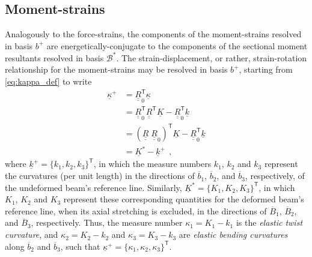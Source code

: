 \documentclass[12pt,a4paper,oneside,english]{abntex2} %
\newcommand{\vect}[1]{\underline{#1}}
\newcommand{\uvec}[1]{\overline{#1}}
\def\tens#1{\underline{\underline{#1}}}
\def\lp{\left(}
\def\rp{\right)}
\def\T{\mathsf{T}}
\def\bp{b^+}
\def\B*{\mathcal{B}^*}
\def\R{\tens{R}}
\def\RT{\R^\T}
\def\Rz{\R_0}
\def\RzT{\R^\T_0}
\def\kap{\vect{\kappa}}
\def\kapp{\kap^{+}}
\def\k{\vect{k}}
\def\kp{\k^{+}}
\def\K{\vect{K}}
\def\Ks{\K^{*}}
\begin{document}
\subsection{Moment-strains}

Analogously to the force-strains, the components of the moment-strains resolved in basis $\bp$ are energetically-conjugate to the components of the sectional moment resultants resolved in basis $\B*$.
The strain-displacement, or rather, strain-rotation relationship for the moment-strains may be resolved in basis $\bp$, starting from \cref{eq:kappa_def} to write
\begin{align}
    \kapp 
    &= \RzT\kap \nonumber 
    \\
    &= \RzT\RT\K-\RzT\k \nonumber 
    \\
    &= \lp\R\;\Rz\rp^\T\K - \RzT\k \nonumber 
    \\
    &= \Ks - \kp \ \ ,
    \label{eq:kappa_plus}
\end{align}
where $\kp = \{k_1,k_2,k_3\}^\T$, in which the measure numbers $k_1$, $k_2$ and $k_3$ represent the curvatures (per unit length) in the directions of $\uvec{b}_1$, $\uvec{b}_2$, and $\uvec{b}_3$, respectively, of the undeformed beam's reference line. Similarly, $\Ks = \{K_1,K_2,K_3\}^\T$, in which $K_1$, $K_2$ and $K_3$ represent these corresponding quantities for the deformed beam's reference line, when its axial stretching is excluded, in the directions of $\uvec{B}_1$, $\uvec{B}_2$, and $\uvec{B}_3$, respectively. Thus, the measure number $\kappa_1 = K_1-k_1$ is the \textit{elastic twist curvature}, and $\kappa_2 = K_2-k_2$ and $\kappa_3 = K_3-k_3$ are \textit{elastic bending curvatures} along $\uvec{b}_2$ and $\uvec{b}_3$, such that $\kapp = \{\kappa_1,\kappa_2,\kappa_3\}^\T$. 
\end{document}
